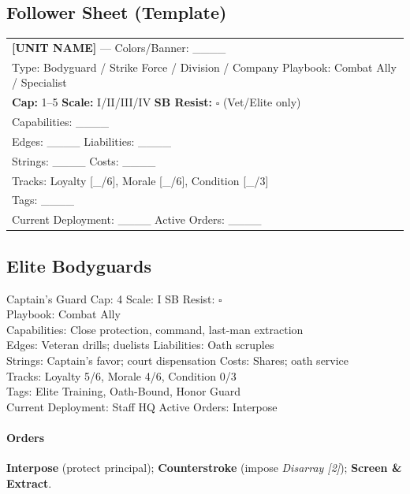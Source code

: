 \documentclass[11pt]{article}
\begin{document}
\subsection*{Follower Sheet (Template)}
\begin{center}
\begin{tabularx}{\textwidth}{|X|}
\hline
\textbf{[UNIT NAME]} --- Colors/Banner: \_\_\_\_ \\
Type: Bodyguard / Strike Force / Division / Company \quad Playbook: Combat Ally / Specialist \\
\textbf{Cap:} 1--5 \quad \textbf{Scale:} I/II/III/IV \quad \textbf{SB Resist:} \(\square\) (Vet/Elite only) \\
Capabilities: \_\_\_\_ \\
Edges: \_\_\_\_ \quad Liabilities: \_\_\_\_ \\
Strings: \_\_\_\_ \quad Costs: \_\_\_\_ \\
Tracks: Loyalty [\_/6], Morale [\_/6], Condition [\_/3] \\
Tags: \_\_\_\_ \\
Current Deployment: \_\_\_\_ \quad Active Orders: \_\_\_\_ \\
\hline
\end{tabularx}
\end{center}

\subsection{Elite Bodyguards}

\begin{followerbox}{Captain's Guard}
Cap: 4 \quad Scale: I \quad SB Resist: \(\square\) \\
Playbook: Combat Ally \\
Capabilities: Close protection, command, last-man extraction \\
Edges: Veteran drills; duelists \quad Liabilities: Oath scruples \\
Strings: Captain's favor; court dispensation \quad Costs: Shares; oath service \\
Tracks: Loyalty 5/6, Morale 4/6, Condition 0/3 \\
Tags: Elite Training, Oath-Bound, Honor Guard \\
Current Deployment: Staff HQ \quad Active Orders: Interpose
\paragraph{Orders}
\textbf{Interpose} (protect principal); \textbf{Counterstroke} (impose \emph{Disarray [2]}); \textbf{Screen \& Extract}.
\end{followerbox}
\end{document}
